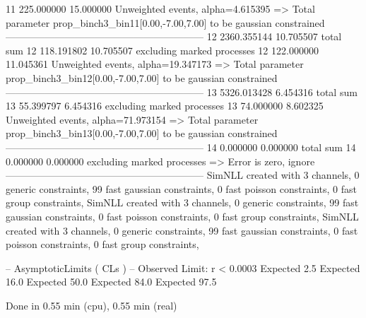 11         225.000000      15.000000       Unweighted events, alpha=4.615395
  => Total parameter prop_binch3_bin11[0.00,-7.00,7.00] to be gaussian constrained
------------------------------------------------------------
12         2360.355144     10.705507       total sum                     
12         118.191802      10.705507       excluding marked processes    
12         122.000000      11.045361       Unweighted events, alpha=19.347173
  => Total parameter prop_binch3_bin12[0.00,-7.00,7.00] to be gaussian constrained
------------------------------------------------------------
13         5326.013428     6.454316        total sum                     
13         55.399797       6.454316        excluding marked processes    
13         74.000000       8.602325        Unweighted events, alpha=71.973154
  => Total parameter prop_binch3_bin13[0.00,-7.00,7.00] to be gaussian constrained
------------------------------------------------------------
14         0.000000        0.000000        total sum                     
14         0.000000        0.000000        excluding marked processes    
  => Error is zero, ignore      
------------------------------------------------------------
SimNLL created with 3 channels, 0 generic constraints, 99 fast gaussian constraints, 0 fast poisson constraints, 0 fast group constraints, 
SimNLL created with 3 channels, 0 generic constraints, 99 fast gaussian constraints, 0 fast poisson constraints, 0 fast group constraints, 
SimNLL created with 3 channels, 0 generic constraints, 99 fast gaussian constraints, 0 fast poisson constraints, 0 fast group constraints, 

 -- AsymptoticLimits ( CLs ) --
Observed Limit: r < 0.0003
Expected  2.5%
Expected 16.0%
Expected 50.0%
Expected 84.0%
Expected 97.5%

Done in 0.55 min (cpu), 0.55 min (real)
